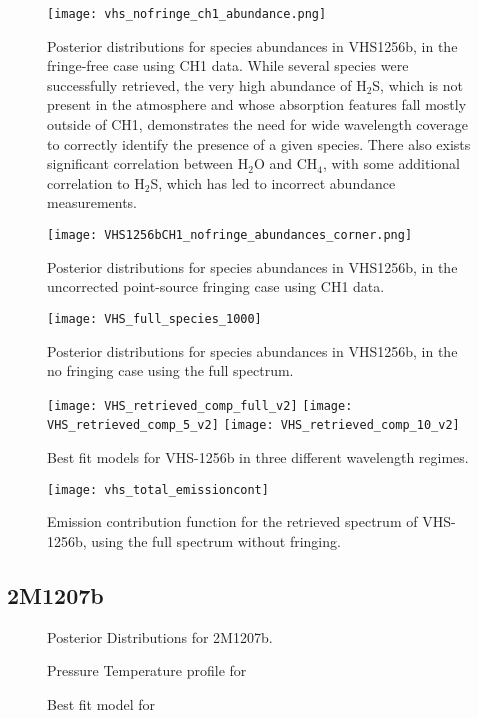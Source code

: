 \begin{figure}[t]
	\centering
	\texttt{[image: vhs\_nofringe\_ch1\_abundance.png]}
	\caption{Posterior distributions for species abundances in VHS1256b, in the fringe-free case using CH1 data. While several species were successfully retrieved, the very high abundance of H$_{2}$S, which is not present in the atmosphere and whose absorption features fall mostly outside of CH1, demonstrates the need for wide wavelength coverage to correctly identify the presence of a given species. There also exists significant correlation between H$_{2}$O and CH$_{4}$, with some additional correlation to H$_{2}$S, which has led to incorrect abundance measurements.}
	\label{fig:postVHS_abundances}
\end{figure}
\begin{figure}
	\centering
	\texttt{[image: VHS1256bCH1\_nofringe\_abundances\_corner.png]}
	\caption{Posterior distributions for species abundances in VHS1256b, in the uncorrected point-source fringing case using CH1 data.}
	\label{fig:postVHS_abundances_fringe}
\end{figure}
\begin{figure}
	\centering
	\texttt{[image: VHS\_full\_species\_1000]}
	\caption{Posterior distributions for species abundances in VHS1256b, in the no fringing case using the full spectrum. }
	\label{fig:postVHS_abundances_full}
\end{figure}

\begin{figure}[h]
	\centering
	\texttt{[image: VHS\_retrieved\_comp\_full\_v2]}
	\texttt{[image: VHS\_retrieved\_comp\_5\_v2]}
	\texttt{[image: VHS\_retrieved\_comp\_10\_v2]}
	\caption{Best fit models for VHS-1256b in three different wavelength regimes.}
	\label{fig:bestfitVHS}
\end{figure}
\begin{figure}[h]
	\texttt{[image: vhs\_total\_emissioncont]}
	\caption{Emission contribution function for the retrieved spectrum of VHS-1256b, using the full spectrum without fringing.}
	\label{fig:VHSemcont}
\end{figure}
\clearpage
\subsection{2M1207b}
\begin{figure}[h]
	\caption{Posterior Distributions for 2M1207b.}
	\label{fig:post2M}
\end{figure}
\begin{figure}[h]
	\caption{Pressure Temperature profile for}
	\label{fig:pres2M}
\end{figure}
\begin{figure}[h]
	\caption{Best fit model for}
	\label{fig:bestfit2M}
\end{figure}
\clearpage
